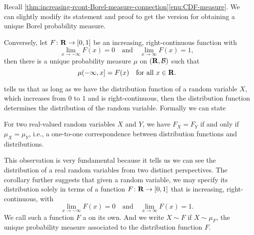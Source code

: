Recall \cref{thm:increasing-rcont-Borel-measure-connection}\ref{enu:CDF-measure}. We can slightly modify its statement and proof to get the version for obtaining a unique Borel probability measure.

\begin{thm} \label{thm:CDF-measure-prob}
    Conversely, let $F\colon \mathbf{R}\to [0,1]$ be an increasing, right-continuous function with \[
        \lim_{x \to -\infty} F(x) = 0\quad \text{and} \quad \lim_{x \to \infty} F(x) = 1,
    \] then there is a unique probability measure $\mu$ on $(\mathbf{R},\mathcal{B})$ such that \[
        \mu(-\infty,x] = F(x) \quad \text{for all }x\in \mathbf{R}.
    \]
\end{thm}

 tells us that as long as we have the distribution function of a random variable $X$, which increases from $0$ to $1$ and is right-continuous, then the distribution function determines the distribution of the random variable. Formally we can state 
\begin{cor} \label{cor:dist-cdf-equiv}
    For two real-valued random variables $X$ and $Y$, we have $F_X = F_Y$ if and only if $\mu_X = \mu_Y$, i.e., a one-to-one correspondence between distribution functions and distributions.
\end{cor}

This observation is very fundamental because it tells us we can see the distribution of a real random variables from two distinct perspectives. The corollary further suggests that given a random variable, we may specify its distribution solely in terms of a function $F\colon \mathbf{R} \to [0,1]$ that is increasing, right-continuous, with \[
        \lim_{x \to -\infty} F(x) = 0\quad \text{and} \quad \lim_{x \to \infty} F(x) = 1.
\] We call such a function $F$ a  on its own. And we write $X \sim F$ if $X \sim \mu_F$, the unique probability measure associated to the distribution function $F$.

